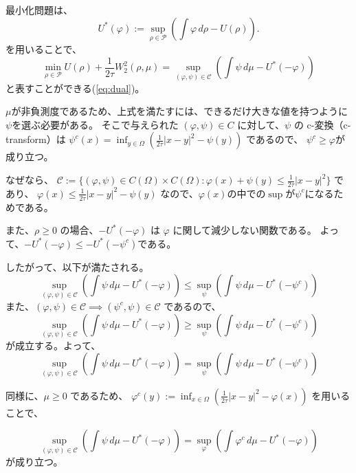 最小化問題は、
\[
    U^*(\varphi) := \sup_{\rho \in \mathcal{P}} \left(\int \varphi \, d\rho - U(\rho) \right).
\]
を用いることで、
\begin{equation*}
    \min_{\rho \in \mathcal{P}} U(\rho) + \frac{1}{2\tau} W_2^2(\rho, \mu) = \sup_{(\varphi, \psi) \in \mathcal{C}} \left(\int \psi \, d\mu - U^*(- \varphi)\right)
\end{equation*}
と表すことができる(\ref{eq:dual})。

$\mu$が非負測度であるため、上式を満たすには、できるだけ大きな値を持つように$\psi$を選ぶ必要がある。
そこで与えられた \((\varphi, \psi) \in C\) に対して、\(\psi\) の c-変換（c-transform）は
$
    \psi^c(x) = \inf_{y \in \Omega} \left( \frac{1}{2\tau}|x-y|^2 - \psi(y)\right)
$
であるので、
\(\psi^c \geq \varphi\)が成り立つ。


なぜなら、
$
    \mathcal{C}  := \{(\varphi, \psi) \in C(\Omega) \times C(\Omega) : \varphi(x) + \psi(y) \leq \frac{1}{2 \tau} |x - y|^2 \}
$
であり、
$
  \varphi(x) \le \frac{1}{2\tau}|x-y|^2 - \psi(y)
$
なので、$\varphi(x)$の中での$\sup$が$\psi^c$になるためである。

また、\(\rho \geq 0\) の場合、\(- U^*(-\varphi)\) は \(\varphi\) に関して減少しない関数である。
よって、{\color{red}$-U^*(- \varphi) \le -U^*(- \psi^c)$}である。


したがって、以下が満たされる。
\[
\sup_{(\varphi, \psi) \in \mathcal{C}} \left(\int \psi \, d\mu - U^*(- \varphi)\right) \le \sup_\psi \left(\int \psi \, d\mu - U^*(- \psi^c)\right)
\]
また、$(\varphi, \psi) \in \mathcal{C} \implies (\psi^c, \psi) \in \mathcal{C}$
であるので、
\[
\sup_{(\varphi, \psi) \in \mathcal{C}} \left(\int \psi \, d\mu - U^*(- \varphi)\right) \ge \sup_\psi \left(\int \psi \, d\mu - U^*(- \psi^c)\right)
\]
が成立する。よって、
\begin{equation}
  \label{eq:psi^c}
\sup_{(\varphi, \psi) \in \mathcal{C}} \left(\int \psi \, d\mu - U^*(- \varphi)\right) = \sup_\psi \left(\int \psi \, d\mu - U^*(- \psi^c)\right)
\end{equation}

同様に、\(\mu \geq 0\) であるため、
$
    \varphi^c(y) := \inf_{x \in \Omega} \left( \frac{1}{2\tau}|x-y|^2 - \varphi(x)\right)
$
を用いることで、

\begin{equation}
  \label{eq:phi^c}
  \sup_{(\varphi, \psi) \in \mathcal{C}} \left(\int \psi \, d\mu - U^*(- \varphi)\right) = \sup_\varphi \left(\int \varphi^c \, d\mu - U^*(- \varphi)\right)
\end{equation}
が成り立つ。

